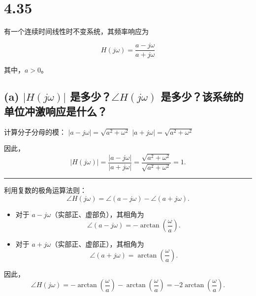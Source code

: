 \documentclass[11pt]{article}
\providecommand{\tightlist}{%
      \setlength{\itemsep}{0pt}\setlength{\parskip}{0pt}}
\begin{document}
    \begin{center}
    \end{center}
    { \hspace*{\fill} \\}
    
    \section{4.35}\label{section}

有一个连续时间线性时不变系统，其频率响应为

\[
H(j\omega) = \frac{a - j\omega}{a + j\omega}
\]

其中，\(a > 0\)。

\subsection{\texorpdfstring{(a) \(|H(j\omega)|\)
是多少？\(\angle H(j\omega)\)
是多少？该系统的单位冲激响应是什么？}{(a) \textbar H(j\textbackslash omega)\textbar{} 是多少？\textbackslash angle H(j\textbackslash omega) 是多少？该系统的单位冲激响应是什么？}}\label{a-hjomega-ux662fux591aux5c11angle-hjomega-ux662fux591aux5c11ux8be5ux7cfbux7edfux7684ux5355ux4f4dux51b2ux6fc0ux54cdux5e94ux662fux4ec0ux4e48}

计算分子分母的模： \(|a - j\omega|=\sqrt{a^2+\omega^2}\)
\(|a + j\omega|=\sqrt{a^2+\omega^2}\)

因此， \[\boxed{
|H(j\omega)|=\frac{|a-j\omega|}{|a+j\omega|}=\frac{\sqrt{a^2+\omega^2}}{\sqrt{a^2+\omega^2}}=1.}
\]

\begin{center}\rule{0.5\linewidth}{0.5pt}\end{center}

利用复数的极角运算法则： \[
\angle H(j\omega)= \angle (a - j\omega)- \angle (a+j\omega).
\]

\begin{itemize}
\tightlist
\item
  对于 \(a-j\omega\)（实部正、虚部负），其相角为 \[
  \angle (a-j\omega)= -\arctan\left(\frac{\omega}{a}\right).
  \]
\item
  对于 \(a+j\omega\)（实部正、虚部正），其相角为 \[
  \angle (a+j\omega)= \arctan\left(\frac{\omega}{a}\right).
  \]
\end{itemize}

因此， \[
\boxed{
\angle H(j\omega)= -\arctan\left(\frac{\omega}{a}\right) - \arctan\left(\frac{\omega}{a}\right)
= - 2\arctan\left(\frac{\omega}{a}\right).}
\]
\end{document}
